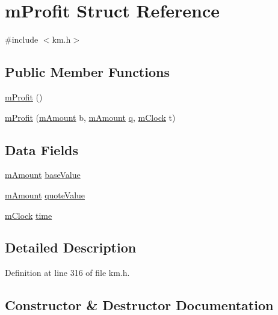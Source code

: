\hypertarget{struct_k_1_1m_profit}{}\section{m\+Profit Struct Reference}
\label{struct_k_1_1m_profit}


{\ttfamily \#include $<$km.\+h$>$}

\subsection*{Public Member Functions}
\begin{DoxyCompactItemize}
\item 
\hyperlink{struct_k_1_1m_profit_a28284966ce82412da109fed28a941653}{m\+Profit} ()
\item 
\hyperlink{struct_k_1_1m_profit_abfd09c3c6542a1053b095d446acce138}{m\+Profit} (\hyperlink{km_8h_ad4d00888c55a47a8a40ed8020d176086}{m\+Amount} b, \hyperlink{km_8h_ad4d00888c55a47a8a40ed8020d176086}{m\+Amount} \hyperlink{namespace_k_a211862d8b09ec46a051464b6859c1306a7694f4a66316e53c8cdd9d9954bd611d}{q}, \hyperlink{km_8h_ad02a70cba4c52ba2013e5e32ceaeac1c}{m\+Clock} t)
\end{DoxyCompactItemize}
\subsection*{Data Fields}
\begin{DoxyCompactItemize}
\item 
\hyperlink{km_8h_ad4d00888c55a47a8a40ed8020d176086}{m\+Amount} \hyperlink{struct_k_1_1m_profit_adbb3d8b288708abaf509a644671fb442}{base\+Value}
\item 
\hyperlink{km_8h_ad4d00888c55a47a8a40ed8020d176086}{m\+Amount} \hyperlink{struct_k_1_1m_profit_aa18e1bafbe0751bf4ba417df1da264d9}{quote\+Value}
\item 
\hyperlink{km_8h_ad02a70cba4c52ba2013e5e32ceaeac1c}{m\+Clock} \hyperlink{struct_k_1_1m_profit_a8c7be9fac36539b28a92dd5240ec377b}{time}
\end{DoxyCompactItemize}


\subsection{Detailed Description}


Definition at line 316 of file km.\+h.



\subsection{Constructor \& Destructor Documentation}

